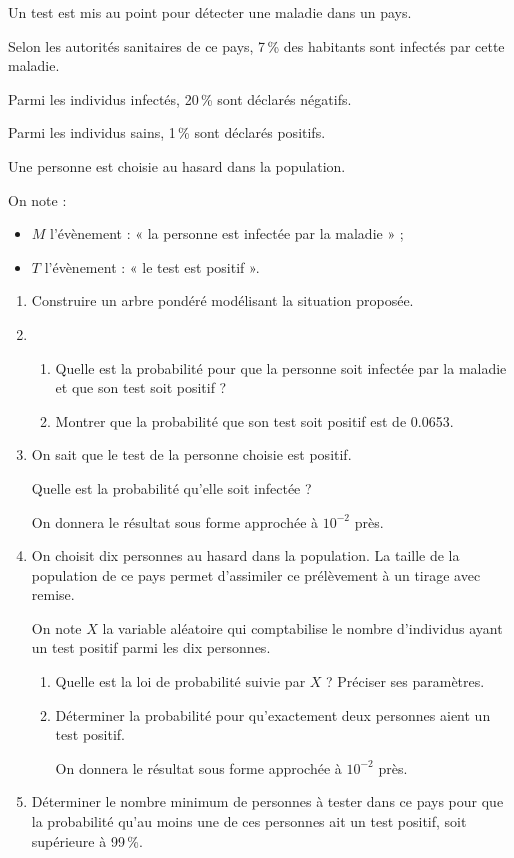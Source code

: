 Un test est mis au point pour détecter une maladie dans un pays.

Selon les autorités sanitaires de ce pays, 7\,\% des habitants sont infectés par cette maladie.

Parmi les individus infectés, 20\,\% sont déclarés négatifs.

Parmi les individus sains, 1\,\% sont déclarés positifs.

Une personne est choisie au hasard dans la population.

On note :

\begin{itemize}
	\item $M$ l’évènement : « la personne est infectée par la maladie » ;
	\item $T$ l’évènement : « le test est positif ».
\end{itemize}

\begin{enumerate}
	\item Construire un arbre pondéré modélisant la situation proposée.
	\item 
	\begin{enumerate}
		\item Quelle est la probabilité pour que la personne soit infectée par la maladie et que son test soit positif ?
		\item Montrer que la probabilité que son test soit positif est de \num{0,0653}.
	\end{enumerate}
	\item On sait que le test de la personne choisie est positif.
	
	Quelle est la probabilité qu’elle soit infectée ?
	
	On donnera le résultat sous forme approchée à $10^{-2}$ près.
	\item On choisit dix personnes au hasard dans la population. La taille de la population de ce pays permet d’assimiler ce prélèvement à un tirage avec remise.
	
	On note $X$ la variable aléatoire qui comptabilise le nombre d’individus ayant un test positif parmi les dix personnes.
	\begin{enumerate}
		\item Quelle est la loi de probabilité suivie par $X$ ? Préciser ses paramètres.
		\item Déterminer la probabilité pour qu’exactement deux personnes aient un test positif.
		
		On donnera le résultat sous forme approchée à $10^{-2}$ près.
	\end{enumerate}
	\item Déterminer le nombre minimum de personnes à tester dans ce pays pour que la probabilité qu’au moins une de ces personnes ait un test positif, soit supérieure à 99\,\%.
\end{enumerate}

